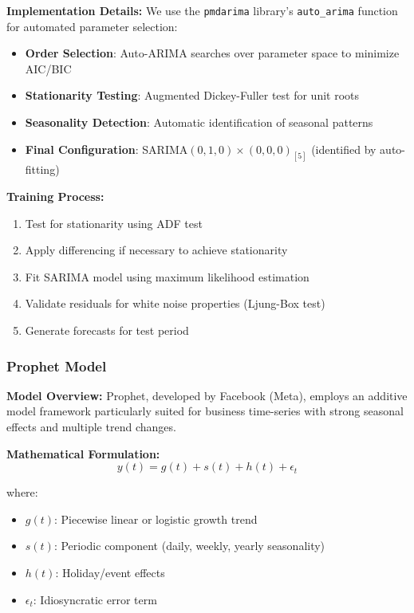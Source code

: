 \documentclass[12pt,a4paper]{article}
\begin{document}
\textbf{Implementation Details:}
We use the \texttt{pmdarima} library's \texttt{auto\_arima} function for automated parameter selection:

\begin{itemize}
    \item \textbf{Order Selection}: Auto-ARIMA searches over parameter space to minimize AIC/BIC
    \item \textbf{Stationarity Testing}: Augmented Dickey-Fuller test for unit roots
    \item \textbf{Seasonality Detection}: Automatic identification of seasonal patterns
    \item \textbf{Final Configuration}: SARIMA$(0,1,0) \times (0,0,0)_{[5]}$ (identified by auto-fitting)
\end{itemize}

\textbf{Training Process:}
\begin{enumerate}
    \item Test for stationarity using ADF test
    \item Apply differencing if necessary to achieve stationarity
    \item Fit SARIMA model using maximum likelihood estimation
    \item Validate residuals for white noise properties (Ljung-Box test)
    \item Generate forecasts for test period
\end{enumerate}

\subsubsection{Prophet Model}

\textbf{Model Overview:}
Prophet, developed by Facebook (Meta), employs an additive model framework particularly suited for business time-series with strong seasonal effects and multiple trend changes.

\textbf{Mathematical Formulation:}
\begin{equation}
y(t) = g(t) + s(t) + h(t) + \epsilon_t
\end{equation}

where:
\begin{itemize}
    \item $g(t)$: Piecewise linear or logistic growth trend
    \item $s(t)$: Periodic component (daily, weekly, yearly seasonality)
    \item $h(t)$: Holiday/event effects
    \item $\epsilon_t$: Idiosyncratic error term
\end{itemize}
\end{document}
